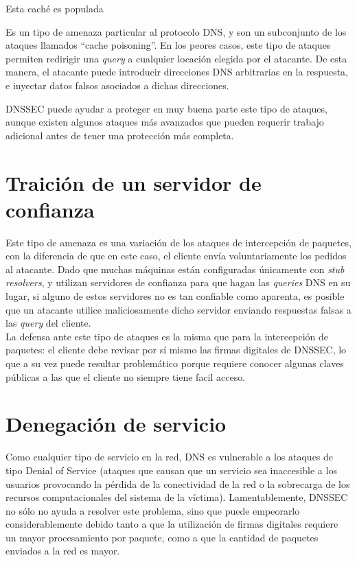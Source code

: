 Esta cach\'e es populada 

Es un tipo de amenaza particular al protocolo DNS, y son un subconjunto de los
ataques llamados ``cache poisoning''. En los peores casos, este tipo de ataques
permiten redirigir una \textit{query} a cualquier locaci\'on elegida por el
atacante. De esta manera, el atacante puede introducir direcciones DNS
arbitrarias en la respuesta, e inyectar datos falsos asociados a dichas
direcciones.

DNSSEC puede ayudar a proteger en muy buena parte este tipo de ataques, aunque
existen algunos ataques m\'as avanzados que pueden requerir trabajo adicional
antes de tener una protecci\'on m\'as completa.

\section{Traici\'on de un servidor de confianza}
Este tipo de amenaza es una variaci\'on de los ataques de intercepci\'on de paquetes, con la diferencia de que en este caso, el cliente env\'ia voluntariamente los pedidos al atacante. Dado que muchas m\'aquinas est\'an configuradas \'unicamente con \textit{stub resolvers}, y utilizan servidores de confianza para que hagan las \textit{queries} DNS en su lugar, si alguno de estos servidores no es tan confiable como aparenta, es posible que un atacante utilice maliciosamente dicho servidor enviando respuestas falsas a las \textit{query} del cliente.\\
La defensa ante este tipo de ataques es la misma que para la intercepci\'on de paquetes: el cliente debe revisar por s\'i mismo las firmas digitales de DNSSEC, lo que a su vez puede resultar problem\'atico porque requiere conocer algunas claves p\'ublicas a las que el cliente no siempre tiene facil acceso.


\section{Denegaci\'on de servicio}
Como cualquier tipo de servicio en la red, DNS es vulnerable a los ataques de tipo Denial of Service (ataques que causan que un servicio sea inaccesible a los usuarios provocando la p\'erdida de la conectividad de la red o la sobrecarga de los recursos computacionales del sistema de la v\'ictima\cite{dos06}). Lamentablemente, DNSSEC no s\'olo no ayuda a resolver este problema, sino que puede empeorarlo considerablemente debido tanto a que la utilizaci\'on de firmas digitales requiere un mayor procesamiento por paquete, como a que la cantidad de paquetes enviados a la red es mayor.


